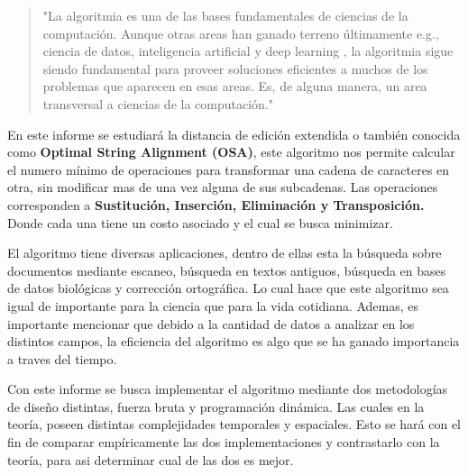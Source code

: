\begin{comment}
\begin{mdframed}
Recuerde que este es su trabajo, y sólo usted puede expresar con precisión lo que ha aprendido y quiere transmitir. Si lo hace bien, su introducción será más significativa y valiosa que cualquier texto automatizado. ¡Confíe en sus habilidades, y verá que puede hacer un mejor trabajo que cualquier herramienta que automatiza la generación de texto!
\end{mdframed}
\end{comment}

\begin{quote}
"La algoritmia es una de las
bases fundamentales de ciencias de la computación. Aunque otras areas
han ganado terreno últimamente e.g., ciencia de datos, inteligencia
artificial y deep learning , la algoritmia sigue siendo fundamental para
proveer soluciones eficientes a muchos de los problemas que aparecen
en esas areas. Es, de alguna manera, un area transversal a ciencias de
la computación."
\end{quote} \cite{algoritmos_discretos}


En este informe se estudiará la distancia de edición 
extendida o también conocida como
\textbf{Optimal String Alignment (OSA)}, este algoritmo nos permite
calcular el numero mínimo de operaciones para transformar una cadena
de caracteres en otra, sin modificar mas de una vez alguna de sus subcadenas. Las operaciones corresponden a \textbf{Sustitución,
Inserción, Eliminación y Transposición.} Donde cada una tiene un costo
asociado y el cual se busca minimizar.

El algoritmo tiene diversas aplicaciones, dentro de ellas esta
la búsqueda sobre documentos mediante escaneo, búsqueda en textos antiguos,
búsqueda en bases de datos biológicas y corrección ortográfica. Lo cual
hace que este algoritmo sea igual de importante para la ciencia que para
la vida cotidiana. Ademas, es importante mencionar que debido a la cantidad
de datos a analizar en los distintos campos, la eficiencia del algoritmo
es algo que se ha ganado importancia a traves del tiempo.
\cite{algoritmos_discretos}

Con este informe se busca implementar el algoritmo mediante dos metodologías
de diseño distintas, fuerza bruta y programación dinámica. Las cuales en la
teoría, poseen distintas complejidades temporales y espaciales. Esto se hará
con el fin de comparar empíricamente las dos implementaciones y 
contrastarlo con la teoría, para asi determinar cual de las dos es mejor.

